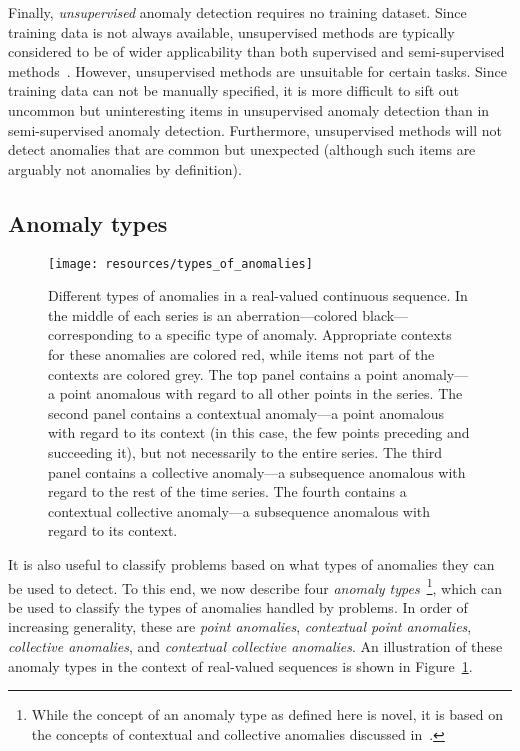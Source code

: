 Finally, \emph{unsupervised} anomaly detection requires no training dataset. Since training data is not always available, unsupervised methods are typically considered to be of wider applicability than both supervised and semi-supervised methods~\cite{chandola}. However, unsupervised methods are unsuitable for certain tasks. Since training data can not be manually specified, it is more difficult to sift out uncommon but uninteresting items in unsupervised anomaly detection than in semi-supervised anomaly detection. Furthermore, unsupervised methods will not detect anomalies that are common but unexpected (although such items are arguably not anomalies by definition).

\subsection{Anomaly types}
\label{sect:anomaly_types}

\begin{figure}[htb]
    \begin{center}
        \texttt{[image: resources/types\_of\_anomalies]}
    \end{center}
    \caption{{\small Different types of anomalies in a real-valued continuous sequence. In the middle of each series is an aberration---colored black---corresponding to a specific type of anomaly. Appropriate contexts for these anomalies are colored red, while items not part of the contexts are colored grey. The top panel contains a point anomaly---a point anomalous with regard to all other points in the series. The second panel contains a contextual anomaly---a point anomalous with regard to its context (in this case, the few points preceding and succeeding it), but not necessarily to the entire series. The third panel contains a collective anomaly---a subsequence anomalous with regard to the rest of the time series. The fourth contains a contextual collective anomaly---a subsequence anomalous with regard to its context.}}
\label{fig:anomaly_types}
\end{figure}

It is also useful to classify problems based on what types of anomalies they can be used to detect. To this end, we now describe four \emph{anomaly types}~\footnote{While the concept of an anomaly type as defined here is novel, it is based on the concepts of contextual and collective anomalies discussed in~\cite{chandola}.}, which can be used to classify the types of anomalies handled by problems. In order of increasing generality, these are \emph{point anomalies}, \emph{contextual point anomalies}, \emph{collective anomalies}, and \emph{contextual collective anomalies}. An illustration of these anomaly types in the context of real-valued sequences is shown in Figure~\ref{fig:anomaly_types}.

